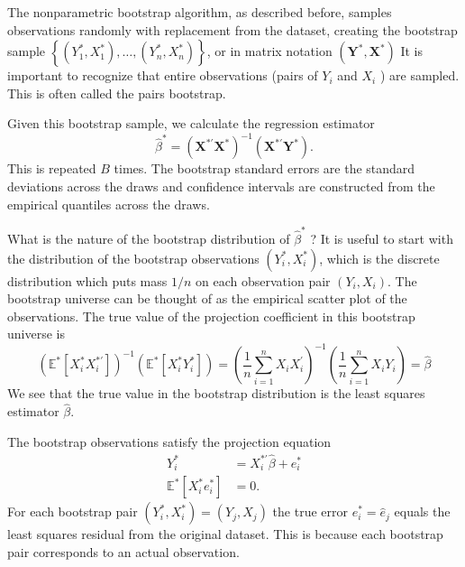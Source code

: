 \documentclass[10pt]{article}
\begin{document}
The nonparametric bootstrap algorithm, as described before, samples observations randomly with replacement from the dataset, creating the bootstrap sample $\left\{\left(Y_{1}^{*}, X_{1}^{*}\right), \ldots,\left(Y_{n}^{*}, X_{n}^{*}\right)\right\}$, or in matrix notation $\left(\boldsymbol{Y}^{*}, \boldsymbol{X}^{*}\right)$ It is important to recognize that entire observations (pairs of $Y_{i}$ and $X_{i}$ ) are sampled. This is often called the pairs bootstrap.

Given this bootstrap sample, we calculate the regression estimator
$$
\widehat{\beta}^{*}=\left(\boldsymbol{X}^{* \prime} \boldsymbol{X}^{*}\right)^{-1}\left(\boldsymbol{X}^{* \prime} \boldsymbol{Y}^{*}\right) .
$$
This is repeated $B$ times. The bootstrap standard errors are the standard deviations across the draws and confidence intervals are constructed from the empirical quantiles across the draws.

What is the nature of the bootstrap distribution of $\widehat{\beta}^{*}$ ? It is useful to start with the distribution of the bootstrap observations $\left(Y_{i}^{*}, X_{i}^{*}\right)$, which is the discrete distribution which puts mass $1 / n$ on each observation pair $\left(Y_{i}, X_{i}\right)$. The bootstrap universe can be thought of as the empirical scatter plot of the observations. The true value of the projection coefficient in this bootstrap universe is
$$
\left(\mathbb{E}^{*}\left[X_{i}^{*} X_{i}^{* \prime}\right]\right)^{-1}\left(\mathbb{E}^{*}\left[X_{i}^{*} Y_{i}^{*}\right]\right)=\left(\frac{1}{n} \sum_{i=1}^{n} X_{i} X_{i}^{\prime}\right)^{-1}\left(\frac{1}{n} \sum_{i=1}^{n} X_{i} Y_{i}\right)=\widehat{\beta}
$$
We see that the true value in the bootstrap distribution is the least squares estimator $\widehat{\beta}$.

The bootstrap observations satisfy the projection equation
$$
\begin{aligned}
Y_{i}^{*} &=X_{i}^{* \prime} \widehat{\beta}+e_{i}^{*} \\
\mathbb{E}^{*}\left[X_{i}^{*} e_{i}^{*}\right] &=0 .
\end{aligned}
$$
For each bootstrap pair $\left(Y_{i}^{*}, X_{i}^{*}\right)=\left(Y_{j}, X_{j}\right)$ the true error $e_{i}^{*}=\widehat{e}_{j}$ equals the least squares residual from the original dataset. This is because each bootstrap pair corresponds to an actual observation.
\end{document}
